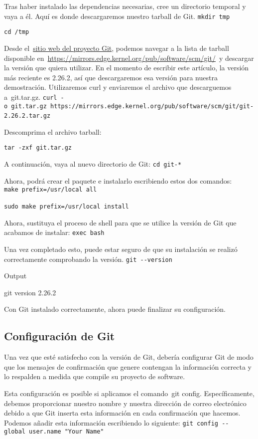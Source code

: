 \documentclass[
  a2paper,
]{article}
\begin{document}
Tras haber instalado las dependencias necesarias, cree un directorio
temporal y vaya a él. Aquí es donde descargaremos nuestro tarball de
Git. \texttt{mkdir\ tmp}

\texttt{cd\ /tmp}

Desde el~\href{https://git-scm.com/}{sitio web del proyecto Git},
podemos navegar a la lista de tarball disponible
en~\url{https://mirrors.edge.kernel.org/pub/software/scm/git/}~y
descargar la versión que quiera utilizar. En el momento de escribir este
artículo, la versión más reciente es 2.26.2, así que descargaremos esa
versión para nuestra demostración. Utilizaremos curl y enviaremos el
archivo que descarguemos a~git.tar.gz.
\texttt{curl\ -o\ git.tar.gz\ https://mirrors.edge.kernel.org/pub/software/scm/git/git-2.26.2.tar.gz}~~

Descomprima el archivo tarball:

\texttt{tar\ -zxf\ git.tar.gz}

A continuación, vaya al nuevo directorio de Git: \texttt{cd\ git-*}~~

Ahora, podrá crear el paquete e instalarlo escribiendo estos dos
comandos: \texttt{make\ prefix=/usr/local\ all}

\texttt{sudo\ make\ prefix=/usr/local\ install}~~

Ahora, sustituya el proceso de shell para que se utilice la versión de
Git que acabamos de instalar: \texttt{exec\ bash}~~

Una vez completado esto, puede estar seguro de que su instalación se
realizó correctamente comprobando la versión. \texttt{git\ -\/-version}

Output

git version 2.26.2

Con Git instalado correctamente, ahora puede finalizar su configuración.

\hypertarget{configuraciuxf3n-de-git}{%
\subsection{Configuración de Git}\label{configuraciuxf3n-de-git}}

Una vez que esté satisfecho con la versión de Git, debería configurar
Git de modo que los mensajes de confirmación que genere contengan la
información correcta y lo respalden a medida que compile su proyecto de
software.

Esta configuración es posible si aplicamos el comando~git config.
Específicamente, debemos proporcionar nuestro nombre y nuestra dirección
de correo electrónico debido a que Git inserta esta información en cada
confirmación que hacemos. Podemos añadir esta información escribiendo lo
siguiente: \texttt{git\ config\ -\/-global\ user.name\ "Your\ Name"}
\end{document}
